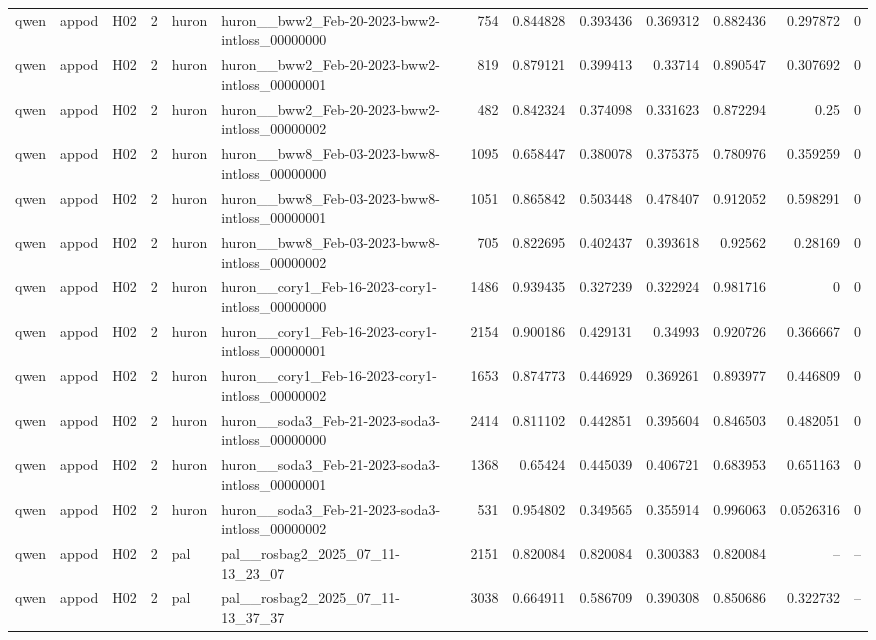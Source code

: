 \begin{longtable}{lllrllrrrrrrr}
qwen & appod & H02 & 2 & huron & huron\_\_bww2\_Feb-20-2023-bww2-intloss\_00000000 & 754 & 0.844828 & 0.393436 & 0.369312 & 0.882436 & 0.297872 & 0 \\
qwen & appod & H02 & 2 & huron & huron\_\_bww2\_Feb-20-2023-bww2-intloss\_00000001 & 819 & 0.879121 & 0.399413 & 0.33714 & 0.890547 & 0.307692 & 0 \\
qwen & appod & H02 & 2 & huron & huron\_\_bww2\_Feb-20-2023-bww2-intloss\_00000002 & 482 & 0.842324 & 0.374098 & 0.331623 & 0.872294 & 0.25 & 0 \\
qwen & appod & H02 & 2 & huron & huron\_\_bww8\_Feb-03-2023-bww8-intloss\_00000000 & 1095 & 0.658447 & 0.380078 & 0.375375 & 0.780976 & 0.359259 & 0 \\
qwen & appod & H02 & 2 & huron & huron\_\_bww8\_Feb-03-2023-bww8-intloss\_00000001 & 1051 & 0.865842 & 0.503448 & 0.478407 & 0.912052 & 0.598291 & 0 \\
qwen & appod & H02 & 2 & huron & huron\_\_bww8\_Feb-03-2023-bww8-intloss\_00000002 & 705 & 0.822695 & 0.402437 & 0.393618 & 0.92562 & 0.28169 & 0 \\
qwen & appod & H02 & 2 & huron & huron\_\_cory1\_Feb-16-2023-cory1-intloss\_00000000 & 1486 & 0.939435 & 0.327239 & 0.322924 & 0.981716 & 0 & 0 \\
qwen & appod & H02 & 2 & huron & huron\_\_cory1\_Feb-16-2023-cory1-intloss\_00000001 & 2154 & 0.900186 & 0.429131 & 0.34993 & 0.920726 & 0.366667 & 0 \\
qwen & appod & H02 & 2 & huron & huron\_\_cory1\_Feb-16-2023-cory1-intloss\_00000002 & 1653 & 0.874773 & 0.446929 & 0.369261 & 0.893977 & 0.446809 & 0 \\
qwen & appod & H02 & 2 & huron & huron\_\_soda3\_Feb-21-2023-soda3-intloss\_00000000 & 2414 & 0.811102 & 0.442851 & 0.395604 & 0.846503 & 0.482051 & 0 \\
qwen & appod & H02 & 2 & huron & huron\_\_soda3\_Feb-21-2023-soda3-intloss\_00000001 & 1368 & 0.65424 & 0.445039 & 0.406721 & 0.683953 & 0.651163 & 0 \\
qwen & appod & H02 & 2 & huron & huron\_\_soda3\_Feb-21-2023-soda3-intloss\_00000002 & 531 & 0.954802 & 0.349565 & 0.355914 & 0.996063 & 0.0526316 & 0 \\
qwen & appod & H02 & 2 & pal & pal\_\_rosbag2\_2025\_07\_11-13\_23\_07 & 2151 & 0.820084 & 0.820084 & 0.300383 & 0.820084 & -- & -- \\
qwen & appod & H02 & 2 & pal & pal\_\_rosbag2\_2025\_07\_11-13\_37\_37 & 3038 & 0.664911 & 0.586709 & 0.390308 & 0.850686 & 0.322732 & -- \\

\end{longtable}
